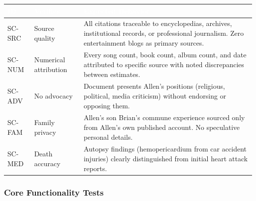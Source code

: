 \documentclass[11pt,letterpaper]{article}
\newcommand{\tableheader}[1]{\textbf{\sffamily\textcolor{white}{#1}}}
\begin{document}
\begin{center}
\begin{tabularx}{\textwidth}{C{1.2cm}L{3cm}X}
\toprule
{}
\tableheader{ID} & \tableheader{Verifies} & \tableheader{Expected Behavior} \\
\midrule
SC-SRC & Source quality & All citations traceable to encyclopedias, archives, institutional records, or professional journalism. Zero entertainment blogs as primary sources. \\
SC-NUM & Numerical attribution & Every song count, book count, album count, and date attributed to specific source with noted discrepancies between estimates. \\
SC-ADV & No advocacy & Document presents Allen's positions (religious, political, media criticism) without endorsing or opposing them. \\
SC-FAM & Family privacy & Allen's son Brian's commune experience sourced only from Allen's own published account. No speculative personal details. \\
SC-MED & Death accuracy & Autopsy findings (hemopericardium from car accident injuries) clearly distinguished from initial heart attack reports. \\
\bottomrule
\end{tabularx}
\end{center}

\subsubsection{Core Functionality Tests}
\end{document}
